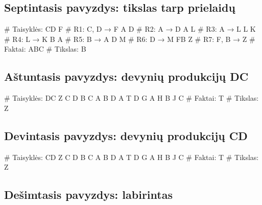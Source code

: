 \subsection{Septintasis pavyzdys: tikslas tarp prielaidų}

\begin{pythonaienv}[bc]
# Taisyklės:
CD F                                    # R1: C, D → F
A D                                     # R2: A → D
A L                                     # R3: A → L
L K                                     # R4: L → K
B A                                     # R5: B → A
D M                                     # R6: D → M
FB Z                                    # R7: F, B → Z
# Faktai:
ABC
# Tikslas:
B
\end{pythonaienv}

\subsection{Aštuntasis pavyzdys: devynių produkcijų DC}

\begin{pythonaienv}[bc]
# Taisyklės:
DC Z
C D
B C
A B
D A
T D
G A
H B
J C
# Faktai:
T
# Tikslas:
Z
\end{pythonaienv}

\subsection{Devintasis pavyzdys: devynių produkcijų CD}

\begin{pythonaienv}[bc]
# Taisyklės:
CD Z
C D
B C
A B
D A
T D
G A
H B
J C
# Faktai:
T
# Tikslas:
Z
\end{pythonaienv}

\subsection{Dešimtasis pavyzdys: labirintas}

